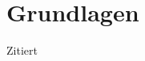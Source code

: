 \begin{comment}
\bibitem{i2b2}
``i2b2 implemented over SMART-on-FHIR'' \newline
\url{https://www.ncbi.nlm.nih.gov/pmc/articles/PMC5961782/}

\bibitem{8-Steps}
``8 Steps to Success in ICD-10-CM/PCS Mapping: Best Practices to Establish Precise Mapping Between Old and New ICD Code Sets'' \newline
\url{https://library.ahima.org/doc?oid=106975} \newline
\url{https://pubmed.ncbi.nlm.nih.gov/22741510/}


\bibitem{ICD-8-9-10}
``Mapping three versions of the international classification of diseases to categories of chronic conditions '' \newline
\url{https://pubmed.ncbi.nlm.nih.gov/34007901/}



\end{thebibliography}
\endgroup
\end{comment}

\section{Grundlagen}

Zitiert

